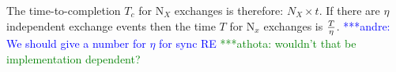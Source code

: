 \documentclass{rspublic}
\newcommand{\jhanote}[1]{ {\textcolor{red} { ***shantenu: #1 }}}
\newcommand{\alnote}[1]{ {\textcolor{blue} { ***andre: #1 }}}
\newcommand{\athotanote}[1]{ {\textcolor{green} { ***athota: #1 }}}
\newcommand{\alnote}[1]{}
\newcommand{\athotanote}[1]{}
\newcommand{\jhanote}[1]{}
\begin{document}
The time-to-completion $T_{c}$ for N$_{X}$ exchanges is therefore: $N_{X} \times t$.
If there are $\eta$ independent exchange events then the time $T$ for 
N$_x$ exchanges is $T \over \eta$. \alnote{We should give a number for $\eta$ for sync RE}\athotanote{wouldn't that be implementation dependent?}


\end{document}
